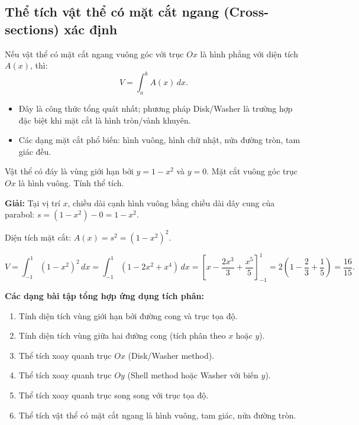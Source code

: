 \documentclass[12pt,a4paper]{article}
\begin{document}
\subsection{Thể tích vật thể có mặt cắt ngang (Cross-sections) xác định}

\begin{congthuc}[title={Công thức thể tích bằng mặt cắt ngang}]
  Nếu vật thể có mặt cắt ngang vuông góc với trục $Ox$ là hình phẳng với diện tích $A(x)$, thì:
  \[
    V = \int_a^b A(x)\,dx.
  \]
\end{congthuc}

\begin{luuy}
  \begin{itemize}
    \item Đây là công thức tổng quát nhất; phương pháp Disk/Washer là trường hợp đặc biệt khi mặt cắt là hình tròn/vành khuyên.
    \item Các dạng mặt cắt phổ biến: hình vuông, hình chữ nhật, nửa đường tròn, tam giác đều.
  \end{itemize}
\end{luuy}

\begin{vidu}
  Vật thể có đáy là vùng giới hạn bởi $y = 1 - x^2$ và $y = 0$. Mặt cắt vuông góc trục $Ox$ là hình vuông. Tính thể tích.

  \medskip\textbf{Giải:}
  Tại vị trí $x$, chiều dài cạnh hình vuông bằng chiều dài dây cung của parabol: $s = (1-x^2) - 0 = 1 - x^2$.

  Diện tích mặt cắt: $A(x) = s^2 = (1-x^2)^2$.

  \[
    V = \int_{-1}^1 (1-x^2)^2\,dx = \int_{-1}^1 (1 - 2x^2 + x^4)\,dx
    = \left[x - \frac{2x^3}{3} + \frac{x^5}{5}\right]_{-1}^1 = 2\left(1 - \frac{2}{3} + \frac{1}{5}\right) = \frac{16}{15}.
  \]
\end{vidu}

\medskip\noindent\textbf{Các dạng bài tập tổng hợp ứng dụng tích phân:}
\begin{enumerate}[label=\textbf{Dạng \arabic*:}, leftmargin=*, align=left]
  \item Tính diện tích vùng giới hạn bởi đường cong và trục tọa độ.
  \item Tính diện tích vùng giữa hai đường cong (tích phân theo $x$ hoặc $y$).
  \item Thể tích xoay quanh trục $Ox$ (Disk/Washer method).
  \item Thể tích xoay quanh trục $Oy$ (Shell method hoặc Washer với biến $y$).
  \item Thể tích xoay quanh trục song song với trục tọa độ.
  \item Thể tích vật thể có mặt cắt ngang là hình vuông, tam giác, nửa đường tròn.
\end{enumerate}
\end{document}
